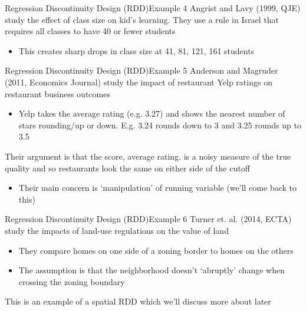 \documentclass[aspectratio=169,t,11pt,table]{beamer}
\begin{document}

\begin{frame}{Regression Discontinuity Design (RDD)}{Example 4}
  Angrist and Lavy (1999, QJE) study the effect of class size on kid's learning.
  They use a rule in Israel that requires all classes to have 40 or fewer students
  \begin{itemize}
    \item This creates sharp drops in class size at 41, 81, 121, 161 students
  \end{itemize}
\end{frame}



\begin{frame}{Regression Discontinuity Design (RDD)}{Example 5}
  Anderson and Magruder (2011, Economics Journal) study the impact of restaurant Yelp ratings on restaurant business outcomes
  \begin{itemize}
    \item Yelp takes the average rating (e.g. 3.27) and shows the nearest number of stars rounding/up or down. E.g. 3.24 rounds down to 3 and 3.25 rounds up to 3.5
  \end{itemize}

  \pause
  \bigskip
  Their argument is that the score, average rating. is a noisy measure of the true quality and so restaurants look the same on either side of the cutoff
  \begin{itemize}
    \item Their main concern is `manipulation' of running variable (we'll come back to this)
  \end{itemize}
\end{frame}

\begin{frame}{Regression Discontinuity Design (RDD)}{Example 6}
  Turner et. al. (2014, ECTA) study the impacts of land-use regulations on the value of land
  \begin{itemize}
    \item They compare homes on one side of a zoning border to homes on the others
    \item The assumption is that the neighborhood doesn't `abruptly' change when crossing the zoning boundary
  \end{itemize}

  \bigskip 
  This is an example of a spatial RDD which we'll discuss more about later
\end{frame}
\end{document}
